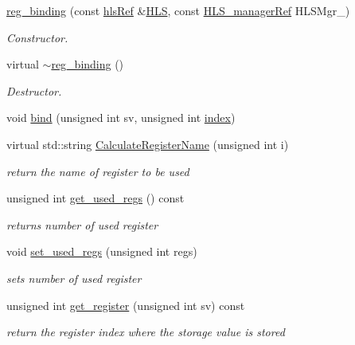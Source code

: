 \begin{DoxyCompactItemize}
\item 
\hyperlink{classreg__binding_ae694dc53d5c425815130c00a5fdef84e}{reg\+\_\+binding} (const \hyperlink{hls_8hpp_a75d0c73923d0ddfa28c4843a802c73a7}{hls\+Ref} \&\hyperlink{classreg__binding_ab715d356b916ed5376a21628b556ef71}{H\+LS}, const \hyperlink{hls__manager_8hpp_acd3842b8589fe52c08fc0b2fcc813bfe}{H\+L\+S\+\_\+manager\+Ref} H\+L\+S\+Mgr\+\_\+)
\begin{DoxyCompactList}\small\item\em Constructor. \end{DoxyCompactList}\item 
virtual \hyperlink{classreg__binding_a4e041c68851cd271288ca373ab2f7e31}{$\sim$reg\+\_\+binding} ()
\begin{DoxyCompactList}\small\item\em Destructor. \end{DoxyCompactList}\item 
void \hyperlink{classreg__binding_ac9d0eb07575596333db08cda5257c1b6}{bind} (unsigned int sv, unsigned int \hyperlink{tutorial__pact__2019_2Introduction_2third_2include_2Keccak_8h_a028c9bdc8344cca38ab522a337074797}{index})
\item 
virtual std\+::string \hyperlink{classreg__binding_ae3ecd3a0314a97830ad0acd2568547c2}{Calculate\+Register\+Name} (unsigned int i)
\begin{DoxyCompactList}\small\item\em return the name of register to be used \end{DoxyCompactList}\item 
unsigned int \hyperlink{classreg__binding_abd5a377a89a2590ab41f32bf54d5f8ae}{get\+\_\+used\+\_\+regs} () const
\begin{DoxyCompactList}\small\item\em returns number of used register \end{DoxyCompactList}\item 
void \hyperlink{classreg__binding_a9148072d5c10c39562d8e63e17cf2ccb}{set\+\_\+used\+\_\+regs} (unsigned int regs)
\begin{DoxyCompactList}\small\item\em sets number of used register \end{DoxyCompactList}\item 
unsigned int \hyperlink{classreg__binding_a3bcf2f1b1510f1c719a8e38667551f60}{get\+\_\+register} (unsigned int sv) const
\begin{DoxyCompactList}\small\item\em return the register index where the storage value is stored \end{DoxyCompactList}\item 

\end{DoxyCompactItemize}
